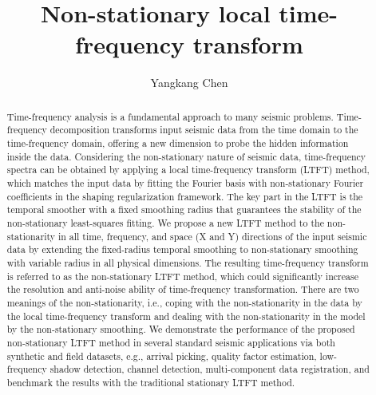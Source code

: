 

\title{Non-stationary local time-frequency transform}
\author{Yangkang Chen}


\address{
Key Laboratory of Geoscience Big Data and Deep Resource of Zhejiang Province\\
School of Earth Sciences\\
Zhejiang University\\
Hangzhou, Zhejiang Province, China, 310027\\
chenyk2016@gmail.com
}


\DeclareRobustCommand{\dlo}[1]{}
\DeclareRobustCommand{\wen}[1]{#1}

\begin{abstract}
Time-frequency analysis is a fundamental approach to many seismic problems. Time-frequency decomposition transforms input seismic data from the time domain to the time-frequency domain, offering a new dimension to probe the hidden information inside the data. Considering the non-stationary nature of seismic data, time-frequency spectra can be obtained by applying a local time-frequency transform (LTFT) method, which matches the input data by fitting the Fourier basis with non-stationary Fourier coefficients in the shaping regularization framework. The key part in the LTFT is the temporal smoother with a fixed smoothing radius that guarantees the stability of the non-stationary least-squares fitting.  We propose a new LTFT method to  the non-stationarity in all time, frequency, and space (X and Y) directions of the input seismic data by extending the fixed-radius temporal smoothing to non-stationary smoothing with variable radius in all physical dimensions. The resulting time-frequency transform is referred to as the non-stationary LTFT method, which could significantly increase the resolution and anti-noise ability of time-frequency \dlo{transform}\wen{transformation}. There are two meanings of the non-stationarity, i.e., coping with the non-stationarity in the data by the local time-frequency transform and dealing with the non-stationarity in the model by the non-stationary smoothing. We demonstrate the performance of the proposed non-stationary LTFT method in several standard seismic applications via both synthetic and field datasets, e.g., arrival picking, quality factor estimation, low-frequency shadow detection, channel detection, multi-component data registration, and benchmark the results with the traditional stationary LTFT method.
\end{abstract}

